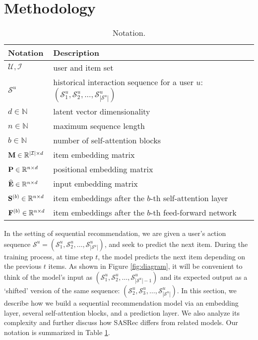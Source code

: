 \documentclass[conference]{IEEEtran}
\def\E{{\bf E}}
\def\F{{\bf F}}
\def\M{{\bf M}}
\def\P{{\bf P}}
\def\S{{\bf S}}
\begin{document}
\section{Methodology}


\begin{table}[t]
\caption{Notation. \label{tb:notation}}
\begin{tabularx}{\linewidth}{lX}
\toprule
Notation&Description\\
\midrule
$\mathcal{U},\mathcal{I}$        & user and item set\\
$\mathcal{S}^u$                 & historical interaction sequence for a user $u$: $(\mathcal{S}^u_1, \mathcal{S}^u_2, ... , \mathcal{S}^u_{|\mathcal{S}^u|})$ \\
$d\in \mathbb{N}$                 & latent vector dimensionality\\
$n\in \mathbb{N}$                 & maximum sequence length\\
$b\in \mathbb{N}$                 & number of self-attention blocks\\
$\M\in\mathbb{R}^{|\mathcal{I}|\times d}$        & item embedding matrix\\
$\P\in\mathbb{R}^{n\times d}$        & positional embedding matrix\\
$\widehat{\E}\in\mathbb{R}^{n\times d}$        & input embedding matrix\\
$\S^{(b)}\in\mathbb{R}^{n\times d}$   & item embeddings after the $b$-th self-attention layer\\
$\F^{(b)}\in\mathbb{R}^{n\times d}$   & item embeddings after the $b$-th feed-forward network\\
\bottomrule
\end{tabularx}
\end{table}


In the setting of sequential recommendation, we are given a user's action sequence $\mathcal{S}^u=(\mathcal{S}^u_1, \mathcal{S}^u_2, \ldots , \mathcal{S}^u_{|\mathcal{S}^u|})$, and seek to predict the next item. During the training process, at time step $t$, the model predicts the next item depending 
on 
the
previous $t$ items. 
As shown in Figure \ref{fig:diagram},
it will be convenient to think of the model's input as
$(\mathcal{S}^u_1, \mathcal{S}^u_2, \ldots , \mathcal{S}^u_{|\mathcal{S}^u|-1})$ 
and its expected output as a `shifted' version of the same sequence:
$(\mathcal{S}^u_2, \mathcal{S}^u_3, \ldots , \mathcal{S}^u_{|\mathcal{S}^u|})$. In this section, we describe 
how we build a sequential recommendation model 
via an
embedding layer, several self-attention blocks, and a prediction layer. We also analyze its complexity and further discuss how SASRec differs from related models.
Our notation is summarized in Table \ref{tb:notation}.
\end{document}
